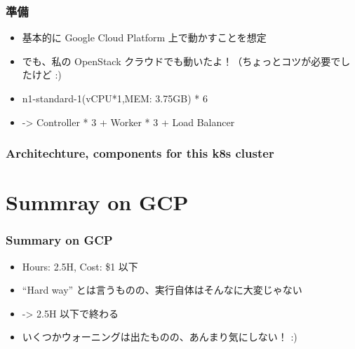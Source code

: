 \documentclass[aspectratio=169,11pt,hyperref={colorlinks=true}]{beamer}
\begin{document}
\begin{frame}
  \frametitle{準備}
  \begin{itemize}
    \item 基本的に Google Cloud Platform 上で動かすことを想定
    \item[] でも、私の OpenStack クラウドでも動いたよ！（ちょっとコツが必要でしたけど :)
    \item n1-standard-1(vCPU*1,MEM: 3.75GB) * 6
    \item[] -> Controller * 3 + Worker * 3 + Load Balancer
  \end{itemize}
\end{frame}

\begin{frame}
  \frametitle{Architechture, components for this k8s cluster}
\end{frame}

\section{Summray on GCP}
\begin{frame}
  \frametitle{Summary on GCP}
  \begin{itemize}
    \item Hours: 2.5H, Cost: \$1 以下
    \item ``Hard way'' とは言うものの、実行自体はそんなに大変じゃない
    \item[]  -> 2.5H 以下で終わる
    \item いくつかウォーニングは出たものの、あんまり気にしない！ :)
  \end{itemize}
\end{frame}
\end{document}
